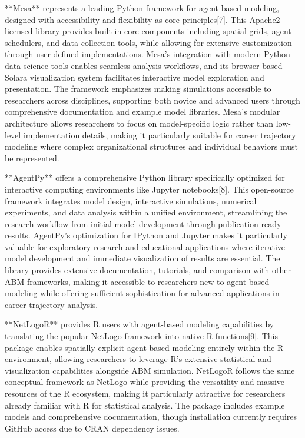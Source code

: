 \documentclass[main.tex]{subfiles}
\begin{document}
**Mesa** represents a leading Python framework for agent-based modeling, designed with accessibility and flexibility as core principles[7]. This Apache2 licensed library provides built-in core components including spatial grids, agent schedulers, and data collection tools, while allowing for extensive customization through user-defined implementations. Mesa's integration with modern Python data science tools enables seamless analysis workflows, and its browser-based Solara visualization system facilitates interactive model exploration and presentation. The framework emphasizes making simulations accessible to researchers across disciplines, supporting both novice and advanced users through comprehensive documentation and example model libraries. Mesa's modular architecture allows researchers to focus on model-specific logic rather than low-level implementation details, making it particularly suitable for career trajectory modeling where complex organizational structures and individual behaviors must be represented.

**AgentPy** offers a comprehensive Python library specifically optimized for interactive computing environments like Jupyter notebooks[8]. This open-source framework integrates model design, interactive simulations, numerical experiments, and data analysis within a unified environment, streamlining the research workflow from initial model development through publication-ready results. AgentPy's optimization for IPython and Jupyter makes it particularly valuable for exploratory research and educational applications where iterative model development and immediate visualization of results are essential. The library provides extensive documentation, tutorials, and comparison with other ABM frameworks, making it accessible to researchers new to agent-based modeling while offering sufficient sophistication for advanced applications in career trajectory analysis.

**NetLogoR** provides R users with agent-based modeling capabilities by translating the popular NetLogo framework into native R functions[9]. This package enables spatially explicit agent-based modeling entirely within the R environment, allowing researchers to leverage R's extensive statistical and visualization capabilities alongside ABM simulation. NetLogoR follows the same conceptual framework as NetLogo while providing the versatility and massive resources of the R ecosystem, making it particularly attractive for researchers already familiar with R for statistical analysis. The package includes example models and comprehensive documentation, though installation currently requires GitHub access due to CRAN dependency issues.
\end{document}
